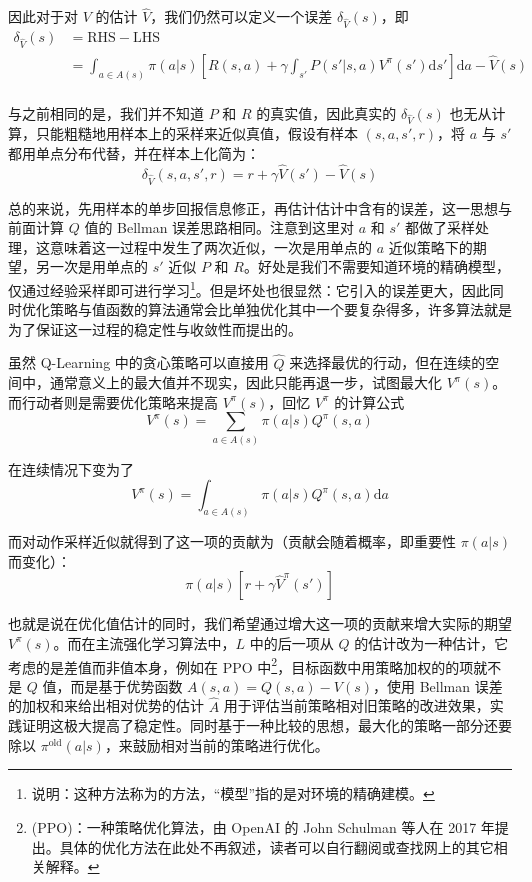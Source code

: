 因此对于对 $V$ 的估计 $\hat V$，我们仍然可以定义一个误差 $\delta_{\hat V} (s)$，即
\[
    \begin{aligned}
        \delta_{\hat V} (s) & = \text{RHS} - \text{LHS}                                                                                                            \\
                            & = \int_{a \in A(s)} \pi(a | s) \left[ R(s, a) + \gamma \int_{s'} P(s' | s, a) V^\pi (s')\mathrm{d}s'\right] \mathrm{d}a - \hat V (s) \\
    \end{aligned}
\]

与之前相同的是，我们并不知道 $P$ 和 $R$ 的真实值，因此真实的 $\delta_{\hat V} (s)$ 也无从计算，只能粗糙地用样本上的采样来近似真值，假设有样本 $(s, a, s', r)$，将 $a$ 与 $s'$ 都用单点分布代替，并在样本上化简为：
\[
    \delta_{\hat V} (s, a, s', r) = r + \gamma \hat V (s') - \hat V (s)
\]

总的来说，先用样本的单步回报信息修正，再估计估计中含有的误差，这一思想与前面计算 $Q$ 值的 Bellman 误差思路相同。注意到这里对 $a$ 和 $s'$ 都做了采样处理，这意味着这一过程中发生了两次近似，一次是用单点的 $a$ 近似策略下的期望，另一次是用单点的 $s'$ 近似 $P$ 和 $R$。好处是我们不需要知道环境的精确模型，仅通过经验采样即可进行学习\footnote{说明：这种方法称为的方法，“模型”指的是对环境的精确建模。}。但是坏处也很显然：它引入的误差更大，因此同时优化策略与值函数的算法通常会比单独优化其中一个要复杂得多，许多算法就是为了保证这一过程的稳定性与收敛性而提出的。

虽然 Q-Learning 中的贪心策略可以直接用 $\hat Q$ 来选择最优的行动，但在连续的空间中，通常意义上的最大值并不现实，因此只能再退一步，试图最大化 $V^\pi (s)$。而行动者则是需要优化策略来提高 $V^\pi (s)$，回忆 $V^\pi$ 的计算公式
\[
    V^\pi (s) = \sum_{a \in A(s)} \pi(a | s) Q^\pi (s, a)
\]

在连续情况下变为了
\[
    V^\pi (s) = \int_{a \in A(s)} \pi(a | s) Q^\pi (s, a) \mathrm{d}a
\]

而对动作采样近似就得到了这一项的贡献为（贡献会随着概率，即重要性 $\pi(a | s)$ 而变化）：
\[
    \pi(a | s) [r + \gamma \hat V^\pi (s')]
\]

也就是说在优化值估计的同时，我们希望通过增大这一项的贡献来增大实际的期望 $V^\pi (s)$。而在主流强化学习算法中，$L$ 中的后一项从 $Q$ 的估计改为一种估计，它考虑的是差值而非值本身，例如在 PPO 中\footnote{(PPO)：一种策略优化算法，由 OpenAI 的 John Schulman 等人在 2017 年提出。具体的优化方法在此处不再叙述，读者可以自行翻阅或查找网上的其它相关解释。}，目标函数中用策略加权的的项就不是 $Q$ 值，而是基于优势函数 $A(s, a) = Q(s, a) - V(s)$，使用 Bellman 误差的加权和来给出相对优势的估计 $\hat A$ 用于评估当前策略相对旧策略的改进效果，实践证明这极大提高了稳定性。同时基于一种比较的思想，最大化的策略一部分还要除以 $\pi^{\text{old}} (a | s)$，来鼓励相对当前的策略进行优化。

